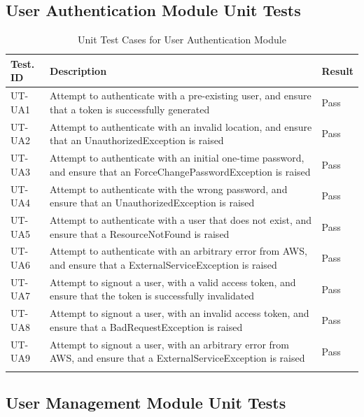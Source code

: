 \documentclass[12pt, titlepage]{article}
\begin{document}
\subsection{User Authentication Module Unit Tests}

\begin{longtable}{|m{2cm}|m{10cm}|m{1.4cm}|}
  \hline
  \textbf{Test. ID} & \textbf{Description} & \textbf{Result} \\ \hline
  UT-UA1 & Attempt to authenticate with a pre-existing user, and
  ensure that a token is successfully generated & Pass\\ \hline
  UT-UA2 & Attempt to authenticate with an invalid location, and
  ensure that an UnauthorizedException is raised & Pass\\ \hline
  UT-UA3 & Attempt to authenticate with an initial one-time
  password, and ensure that an ForceChangePasswordException is raised
  & Pass\\ \hline
  UT-UA4 & Attempt to authenticate with the wrong password, and
  ensure that an UnauthorizedException is raised & Pass\\ \hline
  UT-UA5 & Attempt to authenticate with a user that does not exist,
  and ensure that a ResourceNotFound is raised & Pass\\ \hline
  UT-UA6 & Attempt to authenticate with an arbitrary error from AWS,
  and ensure that a ExternalServiceException is raised & Pass\\ \hline
  UT-UA7 & Attempt to signout a user, with a valid access token, and
  ensure that the token is successfully invalidated & Pass\\ \hline
  UT-UA8 & Attempt to signout a user, with an invalid access token,
  and ensure that a BadRequestException is raised & Pass\\ \hline
  UT-UA9 & Attempt to signout a user, with an arbitrary error from
  AWS, and ensure that a ExternalServiceException is raised & Pass\\ \hline
  \caption{Unit Test Cases for User Authentication Module}
\end{longtable}

\subsection{User Management Module Unit Tests}
\end{document}
